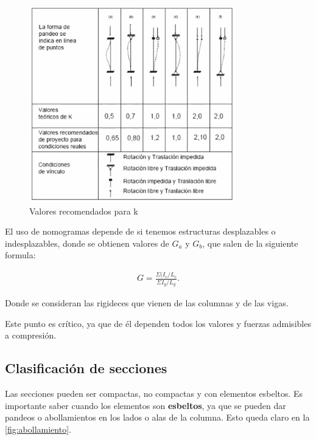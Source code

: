 \documentclass[../main.tex]{subfiles}
\begin{document}
\begin{figure}[ht]
  \centering
  \includegraphics[width=0.8\textwidth]{../images/20210419/long-efectiva}
  \caption{Valores recomendados para k}
  \label{fig:long-efectiva}
\end{figure}

El uso de nomogramas depende de si tenemos estructuras desplazables o indesplazables,
donde se obtienen valores de $G_a$ y  $G_b$, que salen de la siguiente formula:

\begin{align*}
  G = \frac{\Sigma (I_c / L_c}{\Sigma I_g / L_g}
.\end{align*}

Donde se consideran las rigideces que vienen de las columnas y de las vigas.

Este punto es crítico, ya que de él dependen todos los valores y fuerzas admisibles 
a compresión.

\subsection{Clasificación de secciones}
Las secciones pueden ser compactas, no compactas y con elementos esbeltos.
Es importante saber cuando los elementos son \textbf{esbeltos}, ya que se pueden
dar pandeos o abollamientos en los lados o alas de la columna. Esto queda claro
en la \cref{fig:abollamiento}.
\end{document}
